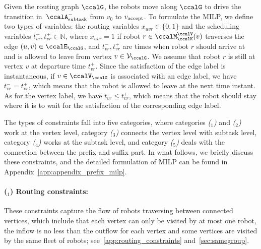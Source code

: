 \documentclass[Afour,sageh,times]{sagej}
\newcounter{mycounter}
\newcommand{\auto}[1]{\ccalA_{\textup{#1}}}
\newcommand{\vertex}[1]{v_{\textup{#1}}}
\begin{document}
Given the routing graph $\ccalG$, the robots move along $\ccalG$ to drive the transition in~$\auto{subtask}^-$ from $v_0$ to $\vertex{\text{accept}}$. To formulate the MILP, we define two types of variables: the routing variables $x_{uvr} \in\{0, 1\}$ and the scheduling variables $t^-_{vr}, t^+_{vr} \in \mathbb{N}$, where $x_{uvr}=1$  if robot  $r\in \ccalM^\ccalV_\ccalK(v)$ traverses the edge $(u,v) \in \ccalE_\ccalG$, and $t^-_{vr}, t^+_{vr}$ are times when robot $r$ should arrive at and is allowed to leave from vertex $v \in \mathcal{V}_\ccalG$. We assume that robot $r$ is still at vertex $v$ at departure time $t^+_{vr}$. Since the satisfaction of the edge label is instantaneous, if $v \in \ccalV_\ccalG$ is associated with an edge label, we have
  $t_{vr}^- = t_{vr}^+$, which means that the robot is allowed to leave at the next time instant. As for the vertex label, we have $t_{vr}^-  \leq t_{vr}^+$, which means that the robot should stay where it is to wait for the satisfaction of the corresponding edge label.

The types of constraints fall into five categories, where categories {\it ($_1$)} and {\it ($_2$)} work at the vertex level, category {\it ($_3$)} connects the vertex level with subtask level, category {\it ($_4$)} works at the subtask level, and category {\it ($_5$)} deals with the connection between the prefix and suffix part. In what follows, we briefly discuss these constraints, and the detailed formulation of MILP  can be found in Appendix~\ref{app:appendix_prefix_milp}.
\paragraph{($_1$) Routing constraints:} These constraints capture  the flow of robots traversing between connected vertices, which include that each vertex can only be visited by at most one robot,  the inflow is no less than the outflow for each vertex and some vertices are visited by the same fleet of robots; see~\ref{app:routing_constraints} and~\ref{sec:samegroup}.
\end{document}

